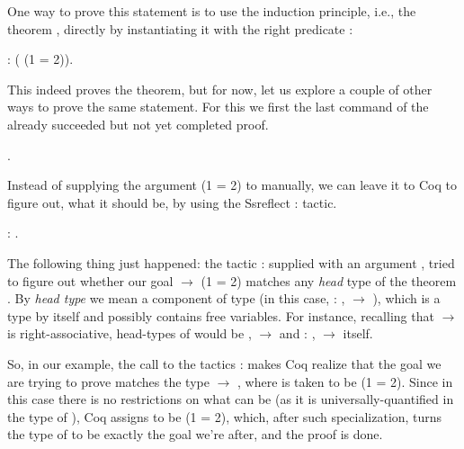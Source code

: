 One way to prove this statement is to use the  induction
principle, i.e., the theorem , directly by instantiating it
with the right predicate :


\begin{coqdoccode}
\coqdocemptyline
\coqdocnoindent
{}: ( (1 = 2)).\coqdoceol
\coqdocemptyline
\end{coqdoccode}


This indeed proves the theorem, but for now, let us explore a couple
of other ways to prove the same statement. For this we first
  the last command of the already succeeded but not
yet completed proof.


\begin{coqdoccode}
\coqdocemptyline
\coqdocnoindent
{}.\coqdoceol
\coqdocemptyline
\end{coqdoccode}


Instead of supplying the argument (1 = 2) to  manually,
we can leave it to Coq to figure out, what it should be, by using the
Ssreflect : tactic.


\begin{coqdoccode}
\coqdocemptyline
\coqdocnoindent
{}: .\coqdoceol
\coqdocemptyline
\end{coqdoccode}


The following thing just happened: the tactic : supplied with
an argument , tried to figure out whether our goal 
\ensuremath{\rightarrow} (1 = 2) matches any \textit{head} type of the theorem .
 By \textit{head type} we mean a component of type (in
this case, \coqdockw{\ensuremath{\forall}}  : ,  \ensuremath{\rightarrow} ), which is a type by itself
and possibly contains free variables. For instance, recalling that
\ensuremath{\rightarrow} is right-associative, head-types of  would be ,
 \ensuremath{\rightarrow}  and \coqdockw{\ensuremath{\forall}}  : ,  \ensuremath{\rightarrow}  itself.


So, in our example, the call to the tactics :  makes
Coq realize that the goal we are trying to prove matches the type
 \ensuremath{\rightarrow} , where  is taken to be (1 = 2). Since in this case
there is no restrictions on what  can be (as it is
universally-quantified in the type of ), Coq assigns  to
be (1 = 2), which, after such specialization, turns the type of
 to be exactly the goal we're after, and the proof is done.


